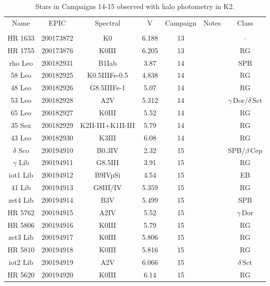 \begin{table*}
\caption{Stars in Campaigns 14-15 observed with halo photometry in K2.\label{table_4}}
\begin{tabular}{ccccccc}
\hline \hline
Name & EPIC & Spectral & V & Campaign & Notes & Class \\
 &  &  &  &  &  &  \\
\hline
HR 1633 & 200173872 & K0 & 6.188 & 13 &  & -- \\
HR 1755 & 200173876 & K0III & 6.205 & 13 &  & RG \\
rho Leo & 200182931 & B1Iab & 3.87 & 14 & \tablenotemark{e} & SPB \\
58 Leo & 200182925 & K0.5IIIFe-0.5 & 4.838 & 14 &  & RG \\
48 Leo & 200182926 & G8.5IIIFe-1 & 5.07 & 14 &  & RG \\
53 Leo & 200182928 & A2V & 5.312 & 14 &  & $\gamma\,\text{Dor} /\delta\,\text{Sct}$ \\
65 Leo & 200182927 & K0III & 5.52 & 14 &  & RG \\
35 Sex & 200182929 & K2II-III+K1II-III & 5.79 & 14 &  & RG \\
43 Leo & 200182930 & K3III & 6.08 & 14 &  & RG \\
$\delta$ Sco & 200194910 & B0.3IV & 2.32 & 15 &  & SPB/$\beta$\,Cep \\
$\gamma$ Lib & 200194911 & G8.5III & 3.91 & 15 &  & RG \\
iot1 Lib & 200194912 & B9IVpSi & 4.54 & 15 & \tablenotemark{b} & EB \\
41 Lib & 200194913 & G8III/IV & 5.359 & 15 &  & RG \\
zet4 Lib & 200194914 & B3V & 5.499 & 15 &  & SPB \\
HR 5762 & 200194915 & A2IV & 5.52 & 15 &  & $\gamma\,\text{Dor}$ \\
HR 5806 & 200194916 & K0III & 5.79 & 15 &  & RG \\
zet3 Lib & 200194917 & K0III & 5.806 & 15 &  & RG \\
HR 5810 & 200194918 & K0III & 5.816 & 15 &  & RG \\
iot2 Lib & 200194919 & A2V & 6.066 & 15 & \tablenotemark{b} & $\delta\,\text{Sct}$ \\
HR 5620 & 200194920 & K0III & 6.14 & 15 &  & RG \\
\hline
\end{tabular}
\end{table*}
